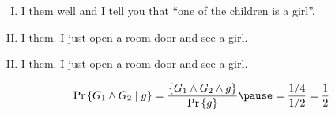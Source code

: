 % 
% 

\begin{frame}{}
  \centerline{}

  \pause
  \vspace{0.30cm}

  \pause
  \begin{enumerate}[(I)]
    \setlength{\itemsep}{8pt}
    \item I  them well and I tell you that ``one of the children is a girl''.
    \pause
    \item I  them. I just open a room door and see a girl.
  \end{enumerate}
\end{frame}

\begin{frame}{}
  \centerline{}

  \vspace{0.60cm}
  \begin{enumerate}[(I)]
    \setcounter{enumi}{1}
    \item {} I  them. I just open a room door and see a girl.
  \end{enumerate}

  \pause
  \vspace{0.50cm}
  \[
    \Pr\set{G_1 \land G_2 \mid g} = \frac{\set{G_1 \land G_2 \land g}}{\Pr\set{g}} \pause = \frac{1/4}{1/2} = \frac{1}{2}
  \]
\end{frame}

